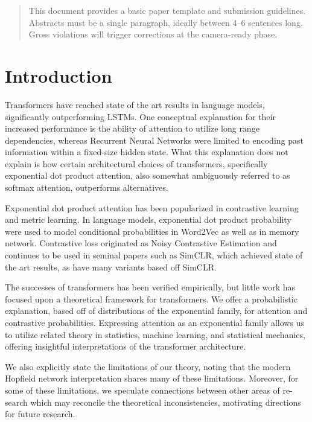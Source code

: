 \documentclass{article}
\begin{document}
\begin{abstract}
This document provides a basic paper template and submission guidelines.
Abstracts must be a single paragraph, ideally between 4--6 sentences long.
Gross violations will trigger corrections at the camera-ready phase.
\end{abstract}

\section{Introduction}
\label{introduction}

Transformers have reached state of the art results in language models, significantly outperforming LSTMs. One conceptual explanation for their increased performance is the ability of attention to utilize long range dependencies, whereas Recurrent Neural Networks were limited to encoding past information within a fixed-size hidden state. 
What this explanation does not explain is how certain architectural choices of transformers, specifically exponential dot product attention, also somewhat ambiguously referred to as softmax attention, outperforms alternatives.

Exponential dot product attention has been popularized in contrastive learning and metric learning. 
In language models, exponential dot product probability were used to model conditional probabilities in Word2Vec as well as in memory network. 
Contrastive loss originated as Noisy Contrastive Estimation and continues to be used in seminal papers such as SimCLR, which achieved state of the art results, as have many variants based off SimCLR.

The successes of transformers has been verified empirically, but little work
has focused upon a theoretical framework for transformers. 
We offer a probabilistic explanation, based off of distributions of the exponential
family, for attention and contrastive probabilities. 
Expressing attention as an exponential family allows us to utilize related theory in statistics, machine learning, and statistical mechanics, offering insightful interpretations of the transformer architecture.

We also explicitly state the limitations of our theory, noting that the modern
Hopfield network interpretation shares many of these limitations. Moreover, for
some of these limitations, we speculate connections between other areas of re-
search which may reconcile the theoretical inconsistencies, motivating directions
for future research.
\end{document}
